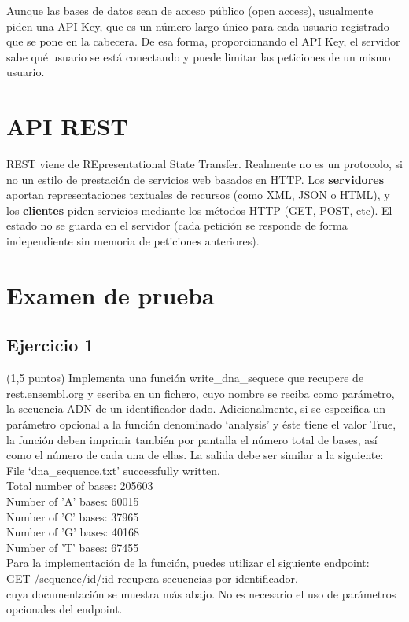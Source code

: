 Aunque las bases de datos sean de acceso público (open access), usualmente piden una API Key, que es un número largo único para cada usuario registrado que se pone en la cabecera. De esa forma, proporcionando el API Key, el servidor sabe qué usuario se está conectando y puede limitar las peticiones de un mismo usuario.

\section{API REST}
REST viene de REpresentational State Transfer. Realmente no es un protocolo, si no un estilo de prestación de servicios web basados en HTTP. 
Los \textbf{servidores} aportan representaciones textuales de recursos (como XML, JSON o HTML), y los \textbf{clientes} piden servicios mediante los métodos HTTP (GET, POST, etc). 
El estado no se guarda en el servidor (cada petición se responde de forma independiente sin memoria de peticiones anteriores).

\section{Examen de prueba}
\subsection{Ejercicio 1}
(1,5 puntos) Implementa una función write\_dna\_sequece que recupere de rest.ensembl.org y escriba en un fichero, cuyo nombre se reciba como parámetro, la secuencia ADN de un identificador dado. Adicionalmente, si se especifica un parámetro opcional a la función denominado ‘analysis’ y éste tiene el valor True, la función deben imprimir también por pantalla el número total de bases, así como el número de cada una de ellas. La salida debe ser similar a la siguiente: \\
File ‘dna\_sequence.txt' successfully written. \\
Total number of bases: 205603 \\
Number of 'A' bases: 60015 \\
Number of 'C' bases: 37965 \\
Number of 'G' bases: 40168 \\
Number of 'T' bases: 67455 \\
Para la implementación de la función, puedes utilizar el siguiente endpoint: \\
GET /sequence/id/:id recupera secuencias por identificador. \\
cuya documentación se muestra más abajo. No es necesario el uso de parámetros opcionales del endpoint.

